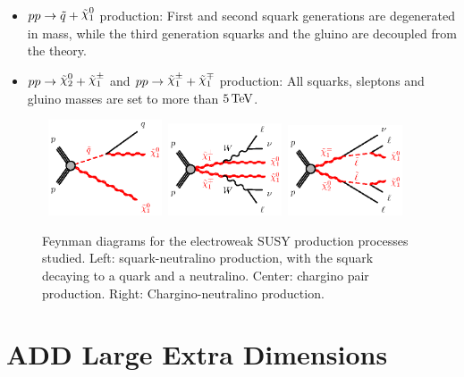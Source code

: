 \begin{itemize}
\item{$\squarkneutralino$ production: } First and second squark generations are degenerated in mass, while the third generation squarks and the gluino are decoupled from the theory.
\item{$\charginoneutralino$ and $\charginochargino$ production: } All squarks, sleptons and gluino masses are set to more than $\unit[5]{TeV}$.
\end{itemize}

\begin{figure}[!ht]
\begin{center}
\mbox{
\includegraphics[width=0.3\textwidth]{BeyondSM/Figures/sqN1-qN1N1.eps}
\includegraphics[width=0.3\textwidth]{BeyondSM/Figures/C1C1-llvvN1N1-WW.eps}
\includegraphics[width=0.3\textwidth]{BeyondSM/Figures/C1N2-lllvN1N1-slsl.eps}
}
\end{center}
\caption[Feynman diagrams for processes involving the direct production of a chargino or a neutralino.]{Feynman diagrams for the electroweak SUSY production processes studied. Left: squark-neutralino production, with the squark decaying to a quark and a neutralino. Center: chargino pair production. Right: Chargino-neutralino production.}
\label{fig:DiagramsElectroweakProduction}
\end{figure}


\section{ADD Large Extra Dimensions}
\label{sec:ADD}

